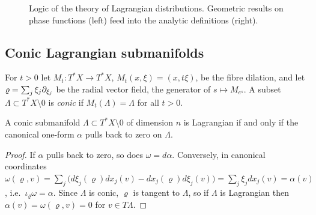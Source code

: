 \begin{figure}[ht]
  \centering
  \caption{Logic of the theory of Lagrangian distributions. Geometric results on
  phase functions (left) feed into the analytic definitions (right).}
  \label{hj:fig:lagrangian-roadmap}
\end{figure}

\subsection{Conic Lagrangian submanifolds}
For $t>0$ let $M_t:T^*X\to T^*X$, $M_t(x,\xi)=(x,t\xi)$, be the fibre dilation,
and let $\varrho=\sum_j\xi_j\partial_{\xi_j}$ be the radial vector field, the
generator of $s\mapsto M_{e^s}$.  A subset $\Lambda\subset T^*X\setminus0$ is
\emph{conic} if $M_t(\Lambda)=\Lambda$ for all $t>0$.

\begin{lemma}\label{hj:lem:conic-lagr}
  A conic submanifold $\Lambda\subset T^*X\setminus0$ of dimension $n$ is
  Lagrangian if and only if the canonical one-form $\alpha$ pulls back to zero on
  $\Lambda$.
\end{lemma}
\begin{proof}
  If $\alpha$ pulls back to zero, so does $\omega=d\alpha$.  Conversely, in
  canonical coordinates $\omega(\varrho,v)=\sum_j\big(d\xi_j(\varrho)dx_j(v)-
  dx_j(\varrho)d\xi_j(v)\big)=\sum_j\xi_jdx_j(v)=\alpha(v)$, i.e.\
  $\iota_\varrho\omega=\alpha$.  Since $\Lambda$ is conic, $\varrho$ is tangent to
  $\Lambda$, so if $\Lambda$ is Lagrangian then $\alpha(v)=\omega(\varrho,v)=0$
  for $v\in T\Lambda$.
\end{proof}

